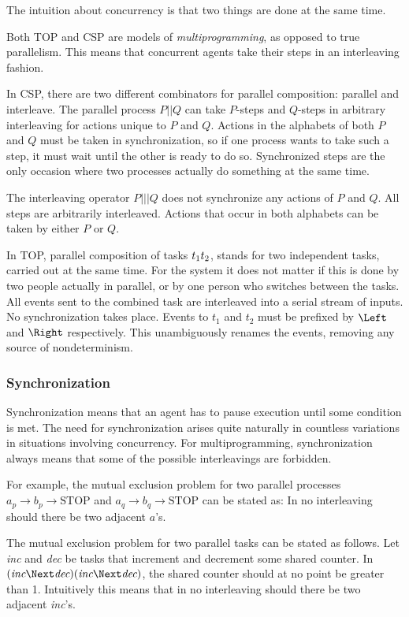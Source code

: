 The intuition about concurrency is that two things are done at the same time.

Both TOP and CSP are models of \emph{multiprogramming}, as opposed to true parallelism.
This means that concurrent agents take their steps in an interleaving fashion.

In CSP, there are two different combinators for parallel composition: parallel and interleave.
The parallel process $P || Q$ can take $P$-steps and $Q$-steps in arbitrary interleaving for actions unique to $P$ and $Q$.
Actions in the alphabets of both $P$ and $Q$ must be taken in synchronization, so if one process wants to take such a step, it must wait until the other is ready to do so.
Synchronized steps are the only occasion where two processes actually do something at the same time.

The interleaving operator $P ||| Q$ does not synchronize any actions of $P$ and $Q$.
All steps are arbitrarily interleaved.
Actions that occur in both alphabets can be taken by either $P$ or $Q$.

In TOP, parallel composition of tasks $t_1 \relax t_2$, stands for two independent tasks, carried out at the same time.
For the system it does not matter if this is done by two people actually in parallel, or by one person who switches between the tasks.
All events sent to the combined task are interleaved into a serial stream of inputs.
No synchronization takes place.
Events to $t_1$ and $t_2$ must be prefixed by $\Left$ and $\Right$ respectively.
This unambiguously renames the events, removing any source of nondeterminism.


\subsubsection*{Synchronization}

Synchronization means that an agent has to pause execution until some condition is met.
The need for synchronization arises quite naturally in countless variations in situations involving concurrency.
For multiprogramming, synchronization always means that some of the possible interleavings are forbidden.

For example, the mutual exclusion problem for two parallel processes $a_p \to b_p \to \text{STOP} $ and $a_q \to b_q \to \text{STOP}$ can be stated as:
In no interleaving should there be two adjacent $a$'s.

The mutual exclusion problem for two parallel tasks can be stated as follows.
Let \textit{inc} and \textit{dec} be tasks that increment and decrement some shared counter.
In $(\textit{inc} \Next \textit{dec}) \And (\textit{inc} \Next \textit{dec})$, the shared counter should at no point be greater than 1.
Intuitively this means that in no interleaving should there be two adjacent \textit{inc}'s.

